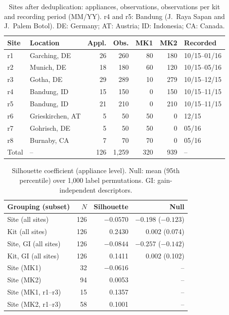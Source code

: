 
\begin{table}[t]
\centering
\caption{Sites after deduplication: appliances, observations, observations per
kit and recording period (MM/YY). r4 and r5: Bandung (J.~Raya Sapan and
J.~Palem Botol). DE: Germany; AT: Austria; ID: Indonesia; CA: Canada.}
\label{tab:sites}
\footnotesize
\setlength{\tabcolsep}{2.5pt}
\begin{tabular}{@{}llrrrrl@{}}
\hline
Site & Location & Appl. & Obs. & MK1 & MK2 & Recorded \\
\hline
r1 & Garching, DE & 26 & 260 & 80 & 180 & 10/15--01/16 \\
r2 & Munich, DE & 18 & 180 & 60 & 120 & 10/15--05/16 \\
r3 & Gotha, DE & 29 & 289 & 10 & 279 & 10/15--12/15 \\
r4 & Bandung, ID & 15 & 150 & 0 & 150 & 10/15--11/15 \\
r5 & Bandung, ID & 21 & 210 & 0 & 210 & 10/15--11/15 \\
r6 & Grieskirchen, AT & 5 & 50 & 50 & 0 & 12/15 \\
r7 & Gohrisch, DE & 5 & 50 & 50 & 0 & 05/16 \\
r8 & Burnaby, CA & 7 & 70 & 70 & 0 & 05/16 \\
\hline
Total & -- & 126 & 1,259 & 320 & 939 & -- \\
\hline
\end{tabular}
\end{table}

\begin{table}[t]
\centering
\caption{Silhouette coefficient (appliance level). Null: mean (95th percentile)
over 1,000 label permutations. GI: gain-independent descriptors.}
\label{tab:sil}
\footnotesize
\setlength{\tabcolsep}{3pt}
\begin{tabular}{@{}lrrr@{}}
\hline
Grouping (subset) & $N$ & Silhouette & Null \\
\hline
Site (all sites) & 126 & $-0.0570$ & $-0.198$ ($-0.123$) \\
Kit (all sites) & 126 & 0.2430 & 0.002 (0.074) \\
Site, GI (all sites) & 126 & $-0.0844$ & $-0.257$ ($-0.142$) \\
Kit, GI (all sites) & 126 & 0.1411 & 0.002 (0.102) \\
Site (MK1) & 32 & $-0.0616$ & -- \\
Site (MK2) & 94 & 0.0053 & -- \\
Site (MK1, r1--r3) & 15 & 0.1357 & -- \\
Site (MK2, r1--r3) & 58 & 0.1001 & -- \\
\hline
\end{tabular}
\end{table}

